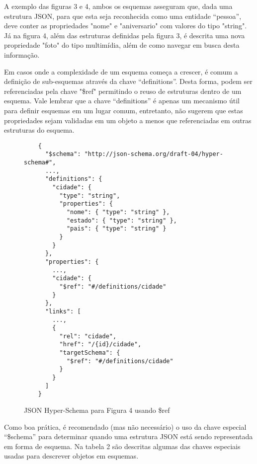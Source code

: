 A exemplo das figuras 3 e 4, ambos os esquemas asseguram que, dada uma estrutura JSON, para que esta seja reconhecida como uma entidade “pessoa”, deve conter as propriedades "nome" e "aniversario" com valores do tipo "string". Já na figura 4, além das estruturas definidas pela figura 3, é descrita uma nova propriedade "foto" do tipo multimídia, além de como navegar em busca desta informação.

Em casos onde a complexidade de um esquema começa a crescer, é comum a definição de sub-esquemas através da chave “definitions”. Desta forma, podem ser referenciadas pela chave "\$ref" permitindo o reuso de estruturas dentro de um esquema. Vale lembrar que a chave “definitions” é apenas um mecanismo útil para definir esquemas em um lugar comum, entretanto, não sugerem que estas propriedades sejam validadas em um objeto a menos que referenciadas em outras estruturas do esquema. \cite{Leach2014}

\begin{figure}[H]
  \centering
  \begin{verbatim}
    {
      "$schema": "http://json-schema.org/draft-04/hyper-schema#",
      ...,
      "definitions": {
        "cidade": {
          "type": "string",
          "properties": {
            "nome": { "type": "string" },
            "estado": { "type": "string" },
            "pais": { "type": "string" }
          }
        }
      },
      "properties": {
        ...,
        "cidade": {
          "$ref": "#/definitions/cidade"
        }
      },
      "links": [
        ...,
        {
          "rel": "cidade",
          "href": "/{id}/cidade",
          "targetSchema": {
            "$ref": "#/definitions/cidade"
          }
        }
      ]
    }
  \end{verbatim}
  \caption{JSON Hyper-Schema para Figura 4 usando \$ref}
\end{figure}

Como boa prática, é recomendado (mas não necessário) o uso da chave especial “\$schema” para determinar quando uma estrutura JSON está sendo representada em forma de esquema. Na tabela 2 são descritas algumas das chaves especiais usadas para descrever objetos em esquemas. \cite{Droettboom2015}

